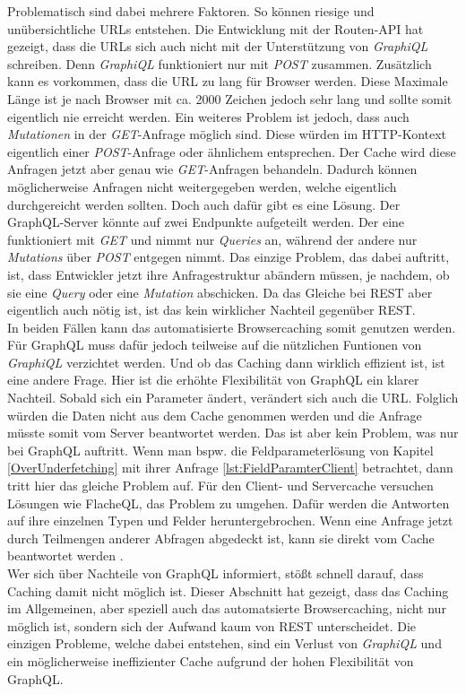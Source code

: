 Problematisch sind dabei mehrere Faktoren. So können riesige und unübersichtliche \ac{URL}s entstehen. Die Entwicklung mit der Routen-API hat gezeigt, dass die \ac{URL}s sich auch nicht mit der Unterstützung von \textit{GraphiQL} schreiben. Denn \textit{GraphiQL} funktioniert nur mit \textit{POST} zusammen. Zusätzlich kann es vorkommen, dass die \ac{URL} zu lang für Browser werden. Diese Maximale Länge ist je nach Browser mit ca. 2000 Zeichen jedoch sehr lang \parencite{Microsoft2020} und sollte somit eigentlich nie erreicht werden. Ein weiteres Problem ist jedoch, dass auch \textit{Mutationen} in der \textit{GET}-Anfrage möglich sind. Diese würden im HTTP-Kontext eigentlich einer \textit{POST}-Anfrage oder ähnlichem entsprechen. Der Cache wird diese Anfragen jetzt aber genau wie \textit{GET}-Anfragen behandeln. Dadurch können möglicherweise Anfragen nicht weitergegeben werden, welche eigentlich durchgereicht werden sollten. Doch auch dafür gibt es eine Lösung. Der GraphQL-Server könnte auf zwei Endpunkte aufgeteilt werden. Der eine funktioniert mit \textit{GET} und nimmt nur \textit{Queries} an, während der andere nur \textit{Mutations} über \textit{POST} entgegen nimmt. Das einzige Problem, das dabei auftritt, ist, dass Entwickler jetzt ihre Anfragestruktur abändern müssen, je nachdem, ob sie eine \textit{Query} oder eine \textit{Mutation} abschicken. Da das Gleiche bei \ac{REST} aber eigentlich auch nötig ist, ist das kein wirklicher Nachteil gegenüber \ac{REST}.\\
In beiden Fällen kann das automatisierte Browsercaching somit genutzen werden. Für GraphQL muss dafür jedoch teilweise auf die nützlichen Funtionen von \textit{GraphiQL} verzichtet werden. Und ob das Caching dann wirklich effizient ist, ist eine andere Frage. Hier ist die erhöhte Flexibilität von GraphQL ein klarer Nachteil. Sobald sich ein Parameter ändert, verändert sich auch die \ac{URL}. Folglich würden die Daten nicht aus dem Cache genommen werden und die Anfrage müsste somit vom Server beantwortet werden. Das ist aber kein Problem, was nur bei GraphQL auftritt. Wenn man bspw. die Feldparameterlösung von Kapitel \ref{OverUnderfetching} mit ihrer Anfrage \ref{lst:FieldParamterClient} betrachtet,  dann tritt hier das gleiche Problem auf. Für den Client- und Servercache versuchen Lösungen wie FlacheQL, das Problem zu umgehen. Dafür werden die Antworten auf ihre einzelnen Typen und Felder heruntergebrochen. Wenn eine Anfrage jetzt durch Teilmengen anderer Abfragen abgedeckt ist, kann sie direkt vom Cache beantwortet werden \parencite{FlacheQL2019}.\\
Wer sich über Nachteile von GraphQL informiert, stößt schnell darauf, dass Caching damit nicht möglich ist. Dieser Abschnitt hat gezeigt, dass das Caching im Allgemeinen, aber speziell auch das automatsierte Browsercaching, nicht nur möglich ist, sondern sich der Aufwand kaum von \ac{REST} unterscheidet. Die einzigen Probleme, welche dabei entstehen, sind ein Verlust von \textit{GraphiQL} und ein möglicherweise ineffizienter Cache aufgrund der hohen Flexibilität von GraphQL.